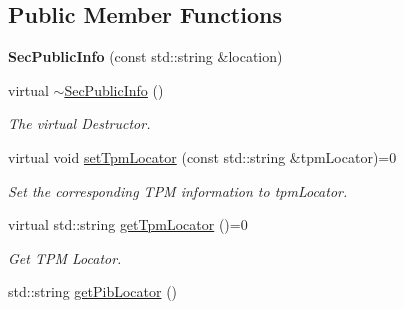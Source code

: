 \subsection*{Public Member Functions}
\begin{DoxyCompactItemize}
\item 
{\bfseries Sec\+Public\+Info} (const std\+::string \&location)\hypertarget{classndn_1_1SecPublicInfo_a23a76a6726895f11453fc24eb88a9046}{}\label{classndn_1_1SecPublicInfo_a23a76a6726895f11453fc24eb88a9046}

\item 
virtual \hyperlink{classndn_1_1SecPublicInfo_a2b557b16442e17f85f50317aa51f9467}{$\sim$\+Sec\+Public\+Info} ()\hypertarget{classndn_1_1SecPublicInfo_a2b557b16442e17f85f50317aa51f9467}{}\label{classndn_1_1SecPublicInfo_a2b557b16442e17f85f50317aa51f9467}

\begin{DoxyCompactList}\small\item\em The virtual Destructor. \end{DoxyCompactList}\item 
virtual void \hyperlink{classndn_1_1SecPublicInfo_a229dca22e8063b81802d9be04edb57a6}{set\+Tpm\+Locator} (const std\+::string \&tpm\+Locator)=0
\begin{DoxyCompactList}\small\item\em Set the corresponding T\+PM information to {\ttfamily tpm\+Locator}. \end{DoxyCompactList}\item 
virtual std\+::string \hyperlink{classndn_1_1SecPublicInfo_aa6c1fe0b5db4fcef867f06572f389957}{get\+Tpm\+Locator} ()=0
\begin{DoxyCompactList}\small\item\em Get T\+PM Locator. \end{DoxyCompactList}\item 
std\+::string \hyperlink{classndn_1_1SecPublicInfo_a9a7a6bd54b95ec045a089fb4d96ae97e}{get\+Pib\+Locator} ()\hypertarget{classndn_1_1SecPublicInfo_a9a7a6bd54b95ec045a089fb4d96ae97e}{}\label{classndn_1_1SecPublicInfo_a9a7a6bd54b95ec045a089fb4d96ae97e}


\end{DoxyCompactItemize}
